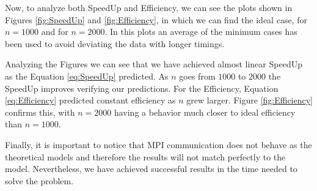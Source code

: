 \documentclass[a4paper]{article}
\begin{document}
    Now, to analyze both SpeedUp and Efficiency, we can see the plots shown in Figures \ref{fig:SpeedUp} and \ref{fig:Efficiency}, in which we can find the ideal case, for $n = 1000$ and for $n = 2000$. In this plots an average of the minimum cases has been used to avoid deviating the data with longer timings.

    Analyzing the Figures we can see that we have achieved almost linear SpeedUp as the Equation \eqref{eq:SpeedUp} predicted. As $n$ goes from $1000$ to $2000$ the SpeedUp improves verifying our predictions. For the Efficiency, Equation \eqref{eq:Efficiency} predicted constant efficiency as $n$ grew larger. Figure \ref{fig:Efficiency} confirms this, with $n = 2000$ having a behavior much closer to ideal efficiency than $n = 1000$.

    Finally, it is important to notice that MPI communication does not behave as the theoretical models and therefore the results will not match perfectly to the model. Nevertheless, we have achieved successful results in the time needed to solve the problem.
\end{document}
